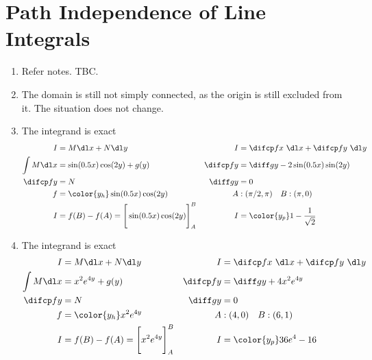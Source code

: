 \section{Path Independence of Line Integrals}

\begin{enumerate}
    \item Refer notes. TBC.

    \item The domain is still not simply connected, as the origin is still excluded from
          it. The situation does not change.

    \item The integrand is exact
          \begin{align}
              I            & = M \dl x + N \dl y                       &
              I            & = \difcp fx\ \dl x + \difcp fy\ \dl y       \\
              \int M \dl x & =\sin(0.5x) \cos(2y) + g(y)               &
              \difcp fy    & = \diff gy - 2\sin(0.5x)\sin(2y)            \\
              \difcp fy    & = N                                       &
              \diff gy     & = 0                                         \\
              f            & =\color{y_h} \sin(0.5x)\cos(2y)           &
              A            & : (\pi/2, \pi) \quad B: (\pi, 0)            \\
              I            & = f(B) - f(A) = \Bigg[ \sin(0.5x)\cos(2y)
              \Bigg]_A^B   &
              I            & = \color{y_p} 1 - \frac{1}{\sqrt{2}}
          \end{align}

    \item The integrand is exact
          \begin{align}
              I            & = M \dl x + N \dl y                   &
              I            & = \difcp fx\ \dl x + \difcp fy\ \dl y   \\
              \int M \dl x & = x^2 e^{4y} + g(y)                   &
              \difcp fy    & = \diff gy + 4 x^2 e^{4y}               \\
              \difcp fy    & = N                                   &
              \diff gy     & = 0                                     \\
              f            & =\color{y_h} x^2 e^{4y}               &
              A            & : (4, 0) \quad B: (6, 1)                \\
              I            & = f(B) - f(A) = \Bigg[ x^2 e^{4y}
              \Bigg]_A^B   &
              I            & = \color{y_p} 36e^4 - 16
          \end{align}


\end{enumerate}
